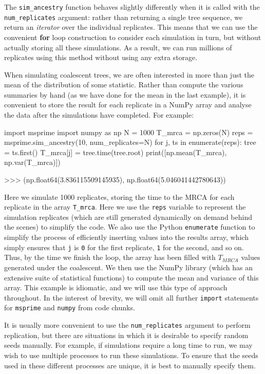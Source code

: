\documentclass[graybox]{svmult}
\begin{document}
The
\texttt{sim\_ancestry} function behaves slightly differently when it is
called with the \texttt{num\_replicates} argument: rather than returning
a single tree sequence, we return an \emph{iterator} over the individual
replicates. This means that we can use the
convenient \textbf{for} loop construction to consider each simulation in
turn, but without actually storing all these simulations. As a result,
we can run millions of replicates using this method without
using any extra storage.

When simulating coalescent trees, we are often interested in more than
just the mean of the distribution of some statistic. Rather than compute
the various summaries by hand (as we have done for the mean in the last
example), it is convenient to store the result for each
replicate in a NumPy array and analyse the data after the simulations have completed.
For example:

\begin{pythoncode}
import msprime
import numpy as np
N = 1000
T_mrca = np.zeros(N)
reps = msprime.sim_ancestry(10, num_replicates=N)
for j, ts in enumerate(reps):
    tree = ts.first()
    T_mrca[j] = tree.time(tree.root)
print([np.mean(T_mrca), np.var(T_mrca)])

>>> (np.float64(3.836115509145935), np.float64(5.046041442780643))
\end{pythoncode}

Here we simulate 1000 replicates, storing the time to the MRCA for each replicate in the array \texttt{T\_mrca}.
Here we use the \texttt{reps} variable
to represent the simulation replicates (which are still generated dynamically
on demand behind the scenes) to simplify the code.
We also use the Python \texttt{enumerate} function to simplify the process of efficiently inserting values into
the results array, which simply ensures that \texttt{j} is \texttt{0} for the first replicate,
\texttt{1} for the second, and so on.
Thus, by the time we finish the
loop, the array has been filled with $T_{MRCA}$ values generated
under the coalescent. We then use the NumPy library (which has
an extensive suite of statistical functions) to compute the mean and
variance of this array. This example is idiomatic, and we will use this
type of approach throughout.
In the interest of brevity, we will omit all
further \texttt{import} statements for \texttt{msprime} and \texttt{numpy}
from code chunks.

It is usually more convenient to use the \texttt{num\_replicates}
argument to perform replication, but there are situations in which it is
desirable to specify random seeds manually. For example, if simulations
require a long time to run, we may wish to use multiple processes to
run these simulations. To ensure that the seeds used in these different
processes are unique, it is best to manually specify them.
\end{document}

